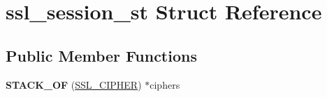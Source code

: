 \hypertarget{structssl__session__st}{}\section{ssl\+\_\+session\+\_\+st Struct Reference}
\label{structssl__session__st}
\subsection*{Public Member Functions}
\begin{DoxyCompactItemize}
\item 
\mbox{\label{structssl__session__st_af03a63e995bab8b99b94d69e298b8e43}} 
{\bfseries S\+T\+A\+C\+K\+\_\+\+OF} (\hyperlink{structssl__cipher__st}{S\+S\+L\+\_\+\+C\+I\+P\+H\+ER}) $\ast$ciphers
\end{DoxyCompactItemize}
